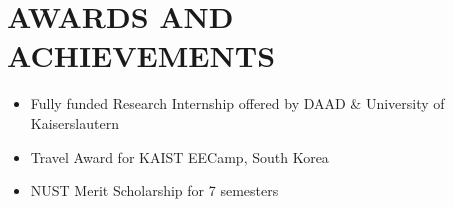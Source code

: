 \documentclass[11pt,letterpaper,roman]{moderncv}        %
\begin{document}
\section{AWARDS AND ACHIEVEMENTS}
\begin{minipage}{\maincolumnwidth}%
	\small{
    	\begin{itemize}
    	\item Fully funded Research Internship offered by DAAD \& University of Kaiserslautern
    	\item Travel Award for KAIST EECamp, South Korea 
    	\item NUST Merit Scholarship for 7 semesters %
		\end{itemize}}%
\end{minipage}%
\end{document}
